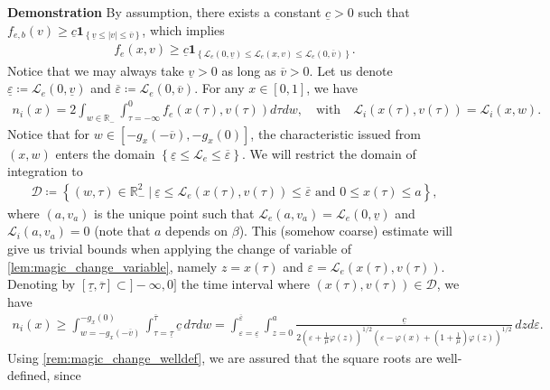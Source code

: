 \documentclass{article}
\numberwithin{equation}{section}
\newcommand{\myproof}[1]{
	\noindent \textbf{Demonstration}
	{\small	#1 \hfill \qedsymbol}
}
\newcommand{\domfel}{{\underline{v}}} %
\newcommand{\domfeu}{{\overline{v}}} %
\newcommand{\minfe}{{\underline{c}}} %
\newcommand{\ee}{\varepsilon} %
\begin{document}
\myproof{
	By assumption, there exists a constant $\minfe>0$ such that $f_{e,b} (v) \geqslant \minfe \textbf{1}_{\left\{\domfel \leqslant |v| \leqslant \domfeu\right\}}$, which implies
	\begin{align*}
		f_e(x,v) \geqslant \minfe \textbf{1}_{\left\{\mathcal{L}_e(0,\domfel) \leqslant \mathcal{L}_e(x,v) \leqslant \mathcal{L}_e(0,\domfeu)\right\}}.
	\end{align*}
	Notice that we may always take $\domfel > 0$ as long as $\domfeu>0$.
	Let us denote $\underline{\ee} \coloneqq \mathcal{L}_e(0,\domfel)$ and $\overline{\ee} \coloneqq \mathcal{L}_e(0,\domfeu)$. For any $x\in[0,1]$, we have
	\begin{align*}
		n_i(x) = 2 \int_{w\in\mathbb{R}_-} \int_{\tau=-\infty}^{0} f_e(x(\tau),v(\tau)) d\tau dw, \quad \text{with} \quad \mathcal{L}_i(x(\tau),v(\tau)) = \mathcal{L}_i(x,w).
	\end{align*}
	Notice that for $w \in [-g_x(-\domfeu),-g_x(0)]$, the characteristic issued from $(x,w)$ enters the domain $\left\{\underline{\ee} \leqslant \mathcal{L}_e \leqslant \overline{\ee}\right\}$. We will restrict the domain of integration to 
	\begin{align*}
		\mathcal{D} \coloneqq \left\{(w,\tau) \in \mathbb{R}_-^2 \ |\ \underline{\ee} \leqslant \mathcal{L}_e(x(\tau),v(\tau)) \leqslant \overline{\ee} \text{ and } 0 \leqslant x(\tau) \leqslant a\right\},
	\end{align*}
	where $(a,v_a)$ is the unique point such that $\mathcal{L}_e(a,v_a) = \mathcal{L}_e(0,\domfel)$ and $\mathcal{L}_i(a,v_a) = 0$ (note that $a$ depends on $\beta$). This (somehow coarse) estimate will give us trivial bounds when applying the change of variable of \cref{lem:magic_change_variable}, namely $z=x(\tau)$ and $\ee = \mathcal{L}_e(x(\tau),v(\tau))$. Denoting by $[\underline{\tau}, \overline{\tau}] \subset ]-\infty,0]$ the time interval where $(x(\tau),v(\tau)) \in \mathcal{D}$, we have
	\begin{align*}
		n_i(x) 
		\geqslant \int_{w=-g_x(-\domfeu)}^{-g_x(0)} \int_{\tau = \underline{\tau}}^{\overline{\tau}} \minfe \, d\tau dw
		= \int_{\ee = \underline{\ee}}^{\overline{\ee}} \int_{z=0}^{a} \frac{\minfe}{2\left(\ee + \frac{1}{\mu} \varphi(z)\right)^{1/2} \left(\ee - \varphi(x) + \left(1+\frac{1}{\mu}\right) \varphi(z)\right)^{1/2}} \, dz d\ee.
	\end{align*}
	Using \cref{rem:magic_change_welldef}, we are assured that the square roots are well-defined, since 
	\begin{align*}

\end{align*}}
\end{document}
